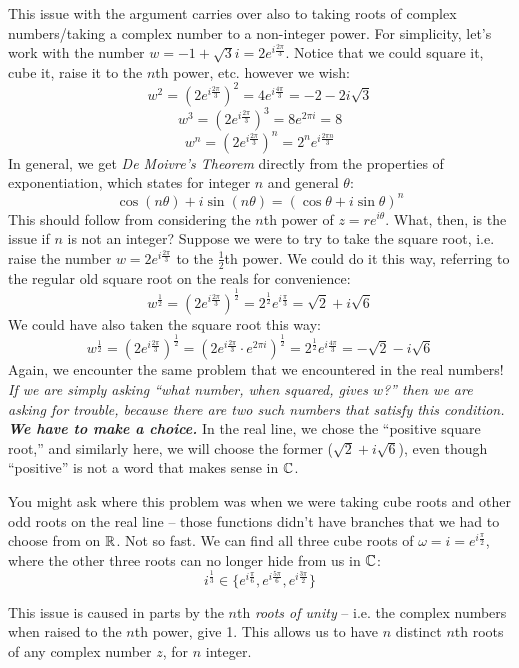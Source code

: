 This issue with the argument carries over also to taking roots of complex numbers/taking a complex number to a non-integer power. For simplicity, let's work with the number $w = -1 + \sqrt{3} i = 2 e^{i\frac{2\pi}{3}}$. Notice that we could square it, cube it, raise it to the $n$th power, etc. however we wish:
\[
    w^2 = \left(2 e^{i\frac{2\pi}{3}} \right)^2 = 4 e^{i \frac{4\pi}{3}} = -2 - 2i \sqrt{3}
\]
\[
    w^3 = \left(2 e^{i\frac{2\pi}{3}}\right)^3 = 8 e^{2\pi i} = 8
\]
\[
    w^n = \left(2 e^{i\frac{2\pi}{3}} \right)^n = 2^n e^{i \frac{2\pi n}{3}}
\]
In general, we get \textit{De Moivre's Theorem} directly from the properties of exponentiation, which states for integer $n$ and general $\theta$:
\[
    \cos(n\theta) + i \sin (n\theta) = \left(\cos \theta + i \sin \theta \right)^n
\]
This should follow from considering the $n$th power of $z = re^{i \theta}$. What, then, is the issue if $n$ is not an integer? Suppose we were to try to take the square root, i.e. raise the number $w = 2 e^{i\frac{2\pi}{3}}$ to the $\frac{1}{2}$th power. We could do it this way, referring to the regular old square root on the reals for convenience:
\[
    w^\frac{1}{2} = \left(2 e^{i\frac{2\pi}{3}} \right)^\frac{1}{2} = 2^\frac{1}{2} e^{i \frac{\pi}{3}} = \sqrt{2} + i \sqrt{6}
\]
We could have also taken the square root this way:
\[
    w^\frac{1}{2} = \left(2 e^{i\frac{2\pi}{3}} \right)^\frac{1}{2} = \left(2 e^{i\frac{2\pi}{3}} \cdot e^{2\pi i} \right)^\frac{1}{2} = 2^\frac{1}{2} e^{i \frac{4\pi}{3}} = -\sqrt{2} - i \sqrt{6}
\]
Again, we encounter the same problem that we encountered in the real numbers! \textit{If we are simply asking ``what number, when squared, gives $w$?'' then we are asking for trouble, because there are two such numbers that satisfy this condition. \textbf{We have to make a choice.}} In the real line, we chose the ``positive square root,'' and similarly here, we will choose the former ($\sqrt{2} + i \sqrt{6}$), even though ``positive'' is not a word that makes sense in $\mathbb C$.

You might ask where this problem was when we were taking cube roots and other odd roots on the real line -- those functions didn't have branches that we had to choose from on $\mathbb R$. Not so fast. We can find all three cube roots of $\omega = i = e^{i\frac{\pi}{2}}$, where the other three roots can no longer hide from us in $\mathbb C$:
\[
    i^\frac{1}{3} \in \{e^{i \frac{\pi}{6}}, e^{i \frac{5\pi}{6}}, e^{i \frac{3\pi}{2}} \}
\]

This issue is caused in parts by the $n$th \textit{roots of unity} -- i.e. the complex numbers when raised to the $n$th power, give 1. This allows us to have $n$ distinct $n$th roots of any complex number $z$, for $n$ integer.

